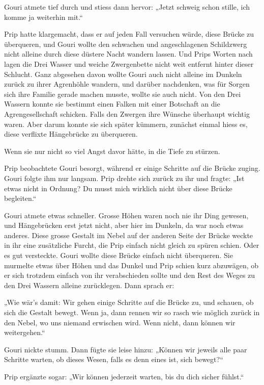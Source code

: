 Gouri atmete tief durch und stiess dann hervor: „Jetzt schweig schon stille, ich komme ja weiterhin mit.“

Prip hatte klargemacht, dass er auf jeden Fall versuchen würde, diese Brücke zu überqueren, und Gouri wollte den schwachen und angeschlagenen Schildzwerg nicht alleine durch diese düstere Nacht wandern lassen. Und Prips Worten nach lagen die Drei Wasser und weiche Zwergenbette nicht weit entfernt hinter dieser Schlucht. Ganz abgesehen davon wollte Gouri auch nicht alleine im Dunkeln zurück zu ihrer Agrenhöhle wandern, und darüber nachdenken, was für Sorgen sich ihre Familie gerade machen musste, wollte sie auch nicht. Von den Drei Wassern konnte sie bestimmt einen Falken mit einer Botschaft an die Agrengesellschaft schicken. Falls den Zwergen ihre Wünsche überhaupt wichtig waren. Aber darum konnte sie sich später kümmern, zunächst einmal hiess es, diese verflixte Hängebrücke zu überqueren.

Wenn sie nur nicht so viel Angst davor hätte, in die Tiefe zu stürzen.

Prip beobachtete Gouri besorgt, während er einige Schritte auf die Brücke zuging. Gouri folgte ihm nur langsam. Prip drehte sich zurück zu ihr und fragte: „Ist etwas nicht in Ordnung? Du musst mich wirklich nicht über diese Brücke begleiten.“

Gouri atmete etwas schneller. Grosse Höhen waren noch nie ihr Ding gewesen, und Hängebrücken erst jetzt nicht, aber hier im Dunkeln, da war noch etwas anderes. Diese grosse Gestalt im Nebel auf der anderen Seite der Brücke weckte in ihr eine zusätzliche Furcht, die Prip einfach nicht gleich zu spüren schien. Oder es gut versteckte. Gouri wollte diese Brücke einfach nicht überqueren. Sie murmelte etwas über Höhen und das Dunkel und Prip schien kurz abzuwägen, ob er sich trotzdem einfach von ihr verabschieden sollte und den Rest des Weges zu den Drei Wassern alleine zurücklegen. Dann sprach er:

„Wie wär’s damit: Wir gehen einige Schritte auf die Brücke zu, und schauen, ob sich die Gestalt bewegt. Wenn ja, dann rennen wir so rasch wie möglich zurück in den Nebel, wo uns niemand erwischen wird. Wenn nicht, dann können wir weitergehen.“

Gouri nickte stumm. Dann fügte sie leise hinzu: „Können wir jeweils alle paar Schritte warten, ob dieses Wesen, falls es denn eines ist, sich bewegt?“

Prip ergänzte sogar: „Wir können jederzeit warten, bis du dich sicher fühlst.“

